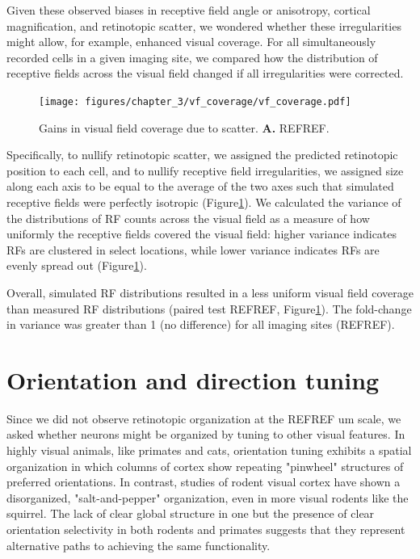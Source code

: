 Given these observed biases in receptive field angle or anisotropy, cortical magnification, and retinotopic scatter, we wondered whether these irregularities might allow, for example, enhanced visual coverage. For all simultaneously recorded cells in a given imaging site, we compared how the distribution of receptive fields across the visual field changed if all irregularities were corrected. 

\begin{figure}[t!]
    \texttt{[image: figures/chapter\_3/vf\_coverage/vf\_coverage.pdf]}
    \vspace{.1in}
    \caption[Compensatory visual field coverage]{Gains in visual field coverage due to scatter. \textbf{A.} REFREF.
    \label{fig:vf_coverage}}
\end{figure}

Specifically, to nullify retinotopic scatter, we assigned the predicted retinotopic position to each cell, and to nullify receptive field irregularities, we assigned size along each axis to be equal to the average of the two axes such that simulated receptive fields were perfectly isotropic (Figure\ref{fig:vf_coverage}). We calculated the variance of the distributions of RF counts across the visual field as a measure of how uniformly the receptive fields covered the visual field:  higher variance indicates RFs are clustered in select locations, while lower variance indicates RFs are evenly spread out (Figure\ref{fig:vf_coverage}). 

Overall, simulated RF distributions resulted in a less uniform visual field coverage than measured RF distributions (paired test REFREF, Figure\ref{fig:vf_coverage}). The fold-change in variance was greater than 1 (no difference) for all imaging sites (REFREF). %



\section{Orientation and direction tuning}
Since we did not observe retinotopic organization at the REFREF um scale, we asked whether neurons might be organized by tuning to other visual features. In highly visual animals, like primates and cats, orientation tuning exhibits a spatial organization in which columns of cortex show repeating "pinwheel" structures of preferred orientations\cite{REFREF}. In contrast, studies of rodent visual cortex have shown a disorganized, "salt-and-pepper" organization\cite{Ohki2005, REFREF}, even in more visual rodents like the squirrel\cite{VanHooser2005FunctionalRodent, REFREF}. The lack of clear global structure in one but the presence of clear orientation selectivity in both rodents and primates suggests that they represent alternative paths to achieving the same functionality.

